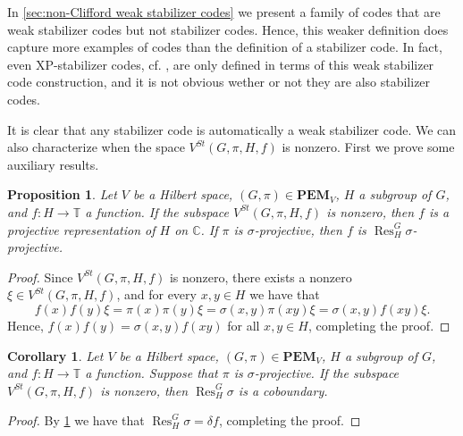 \documentclass[11pt, oneside, reqno]{amsart}
\newcommand{\bbC}{\mathbb{C}}
\newcommand{\bbT}{\mathbb{T}}
\newcommand{\PEM}{\mathbf{PEM}}
\newcommand{\Res}{\operatorname{Res}}
\theoremstyle{definition}
\theoremstyle{plain}
\newtheorem{proposition}[definition]{Proposition}
\newtheorem{corollary}[definition]{Corollary}
\theoremstyle{remark}
\begin{document}
In \cref{sec:non-Clifford weak stabilizer codes} we present a family of codes that are weak stabilizer codes but not stabilizer codes. Hence, this weaker definition does capture more examples of codes than the definition of a stabilizer code. In fact, even XP-stabilizer codes, cf. \cite{Webster2022}, are only defined in terms of this weak stabilizer code construction, and it is not obvious wether or not they are also stabilizer codes.

It is clear that any stabilizer code is automatically a weak stabilizer code. We can also characterize when the space $V^{St}(G,\pi,H,f)$ is nonzero. First we prove some auxiliary results.

\begin{proposition}\label{prop:H f is sigma projective}
    Let $V$ be a Hilbert space, $(G,\pi) \in \PEM_V$, $H$ a subgroup of $G$, and $f \colon H \to \bbT$ a function. If the subspace $V^{St}(G,\pi,H,f)$ is nonzero, then $f$ is a projective representation of $H$ on $\bbC$. If $\pi$ is $\sigma$-projective, then $f$ is $\Res^G_H\sigma$-projective.
\end{proposition}
\begin{proof}
    Since $V^{St}(G,\pi,H,f)$ is nonzero, there exists a nonzero $\xi \in V^{St}(G,\pi,H,f)$, and for every $x,y \in H$ we have that
    \begin{equation*}
        f(x)f(y)\xi 
        = \pi(x)\pi(y)\xi
        = \sigma(x,y)\pi(xy)\xi
        = \sigma(x,y)f(xy)\xi.
    \end{equation*}
    Hence, $f(x)f(y) = \sigma(x,y)f(xy)$ for all $x,y \in H$, completing the proof.
\end{proof}

\begin{corollary}\label{cor:restriction of sigma to H is trivial}
    Let $V$ be a Hilbert space, $(G,\pi) \in \PEM_V$, $H$ a subgroup of $G$, and $f \colon H \to \bbT$ a function. Suppose that $\pi$ is $\sigma$-projective. If the subspace $V^{St}(G,\pi,H,f)$ is nonzero, then $\Res^G_H\sigma$ is a coboundary.
\end{corollary}
\begin{proof}
    By \cref{prop:H f is sigma projective} we have that $\Res^G_H\sigma = \delta f$, completing the proof.
\end{proof}
\end{document}

